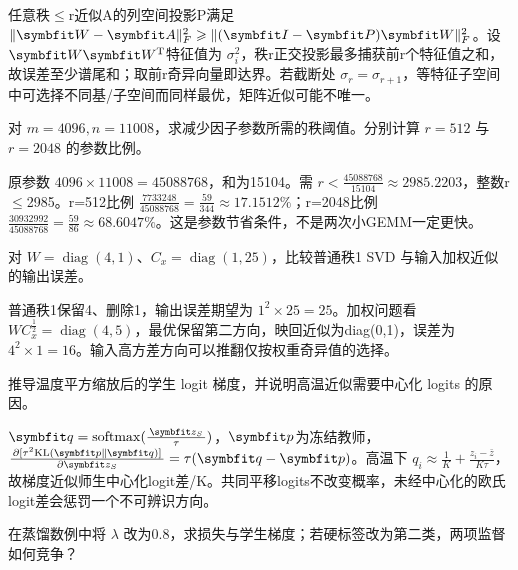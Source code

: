 \begin{exercises}
\begin{exercise}
\begin{solution}
任意秩$\le$r近似A的列空间投影P满足 $\|\mat{W}-\mat{A}\|_F^2\ge\|(\mat{I}-\mat{P})\mat{W}\|_F^2$。设 $\mat{W}\mat{W}^{\mathrm{T}}$特征值为 $\sigma_i^2$，秩r正交投影最多捕获前r个特征值之和，故误差至少谱尾和；取前r奇异向量即达界。若截断处 $\sigma_r=\sigma_{r+1}$，等特征子空间中可选择不同基/子空间而同样最优，矩阵近似可能不唯一。
\end{solution}
\end{exercise}

\begin{exercise} 对 $m=4096,n=11008$，求减少因子参数所需的秩阈值。分别计算 $r=512$ 与 $r=2048$ 的参数比例。

\begin{solution}
原参数 $4096\times11008=45088768$，和为15104。需 $r<\frac{45088768}{15104}\approx2985.2203$，整数r$\le$2985。r=512比例 $\frac{7733248}{45088768}=\frac{59}{344}\approx17.1512\%$；r=2048比例 $\frac{30932992}{45088768}=\frac{59}{86}\approx68.6047\%$。这是参数节省条件，不是两次小GEMM一定更快。
\end{solution}
\end{exercise}

\begin{exercise}\optional 对 $W=\operatorname{diag}(4,1)$、$C_x=\operatorname{diag}(1,25)$，比较普通秩1 SVD 与输入加权近似的输出误差。

\begin{solution}
普通秩1保留4、删除1，输出误差期望为 $1^2\times25=25$。加权问题看 $WC_x^{\frac{1}{2}}=\operatorname{diag}(4,5)$，最优保留第二方向，映回近似为diag(0,1)，误差为 $4^2\times1=16$。输入高方差方向可以推翻仅按权重奇异值的选择。
\end{solution}
\end{exercise}

\begin{exercise} 推导温度平方缩放后的学生 logit 梯度，并说明高温近似需要中心化 logits 的原因。

\begin{solution}
$\vect{q}=\mathrm{softmax}(\frac{\vect{z}_S}{\tau})$，$\vect{p}$为冻结教师，$\frac{\partial[\tau^2\mathrm{KL}(\vect{p}\|\vect{q})]}{\partial \vect{z}_S}=\tau(\vect{q}-\vect{p})$。高温下 $q_i\approx\frac{1}{K}+\frac{z_i-\bar z}{K\tau}$，故梯度近似师生中心化logit差/K。共同平移logits不改变概率，未经中心化的欧氏logit差会惩罚一个不可辨识方向。
\end{solution}
\end{exercise}

\begin{exercise} 在蒸馏数例中将 $\lambda$ 改为0.8，求损失与学生梯度；若硬标签改为第二类，两项监督如何竞争？


\end{exercise}
\end{exercises}
